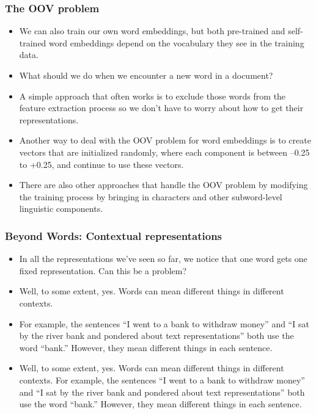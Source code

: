 \documentclass{beamer}
\begin{document}
\begin{frame}
\frametitle{The OOV problem}
\begin{itemize}
\item We can also train our own word embeddings, but both pre-trained and self-trained word embeddings depend on the vocabulary they see in the training data. 
\item What should we do when we encounter a new word in a document? \pause
\item A simple approach that often works is to exclude those words from the feature extraction process so we don’t have to worry about how to get their representations.
\item Another way to deal with the OOV problem for word embeddings is to create vectors that are initialized randomly, where each component is between –0.25 to +0.25, and continue to use these vectors. 
\item There are also other approaches that handle the OOV problem by modifying the training process by bringing in characters and other subword-level linguistic components.
\end{itemize}
\end{frame}

\begin{frame}
\frametitle{Beyond Words: Contextual representations}
\begin{itemize}
\item In all the representations we’ve seen so far, we notice that one word gets one fixed representation. Can this be a problem? 
\item Well, to some extent, yes. Words can mean different things in different contexts. 
\item For example, the sentences “I went to a bank to withdraw money” and “I sat by the river bank and pondered about text representations” both use the word “bank.” However, they mean different things in each sentence. 
\item Well, to some extent, yes. Words can mean different things in different contexts. For example, the sentences “I went to a bank to withdraw money” and “I sat by the river bank and pondered about text representations” both use the word “bank.” However, they mean different things in each sentence. 
\end{itemize}
\end{frame}
\end{document}
